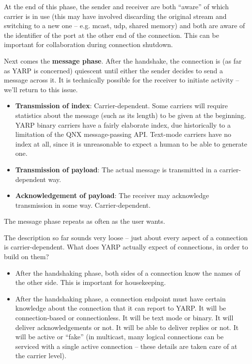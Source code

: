 At the end of this phase, the sender and receiver are both ``aware''
of which carrier is in use (this may have involved discarding the
original stream and switching to a new one -- e.g. mcast, udp, shared
memory) and both are aware of the identifier of the port at the
other end of the connection.  This can be important for collaboration
during connection shutdown.


Next comes the {\bf message phase}.
After the handshake, the connection is (as far as YARP is concerned)
quiescent until either the sender decides to send a message across it.
It is technically possible for the receiver to initiate activity --
we'll return to this issue.

\begin{itemize} \pflist

\item {\bf Transmission of index}: Carrier-dependent. Some carriers
will require statistics about the message (such as its length) to be
given at the beginning.  YARP binary carriers have a fairly elaborate
index, due historically to a limitation of the QNX message-passing
API.  Text-mode carriers have no index at all, since it is
unreasonable to expect a human to be able to generate one.

\item {\bf Transmission of payload}: The actual message is
transmitted in a carrier-dependent way.

\item {\bf Acknowledgement of payload}: The receiver may 
acknowledge transmission in some way.  Carrier-dependent.

\end{itemize}

The message phase repeats as often as the user wants.

The description so far sounds very loose -- just about every aspect
of a connection is carrier-dependent.  What does YARP actually
expect of connections, in order to build on them?

\begin{itemize} \pflist

\item After the handshaking phase, both sides of a connection know the
names of the other side.  This is important for housekeeping.

\item After the handshaking phase, a connection endpoint must have
certain knowledge about the connection that it can report to YARP.  It
will be connection-based or connectionless.  It will be text mode or
binary.  It will deliver acknowledgements or not.  It will be able to
deliver replies or not.  It will be active or ``fake'' (in multicast,
many logical connections can be serviced with a single active
connection -- these details are taken care of at the carrier level).

\end{itemize}

